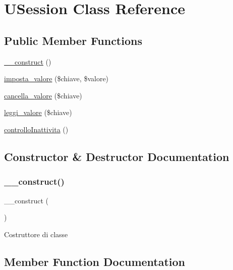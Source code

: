 \hypertarget{class_u_session}{}\section{U\+Session Class Reference}
\label{class_u_session}
\subsection*{Public Member Functions}
\begin{DoxyCompactItemize}
\item 
\mbox{\hyperlink{class_u_session_a095c5d389db211932136b53f25f39685}{\+\_\+\+\_\+construct}} ()
\item 
\mbox{\hyperlink{class_u_session_a0d6c0a123140c7d2ab3c05ce426365ae}{imposta\+\_\+valore}} (\$chiave, \$valore)
\item 
\mbox{\hyperlink{class_u_session_ad4741d902c51917ce50fd0b84758c53e}{cancella\+\_\+valore}} (\$chiave)
\item 
\mbox{\hyperlink{class_u_session_a0cf52bb6465d7b7e63832e513a3bc4b9}{leggi\+\_\+valore}} (\$chiave)
\item 
\mbox{\hyperlink{class_u_session_aeb1ca2b1ac871af9a4b44b2d49202f78}{controllo\+Inattivita}} ()
\end{DoxyCompactItemize}


\subsection{Constructor \& Destructor Documentation}
\mbox{\label{class_u_session_a095c5d389db211932136b53f25f39685}} 
\subsubsection{\texorpdfstring{\+\_\+\+\_\+construct()}{\_\_construct()}}
{\footnotesize\ttfamily \+\_\+\+\_\+construct (\begin{DoxyParamCaption}{ }\end{DoxyParamCaption})}

Costruttore di classe 

\subsection{Member Function Documentation}
\mbox{\label{class_u_session_ad4741d902c51917ce50fd0b84758c53e}} 
